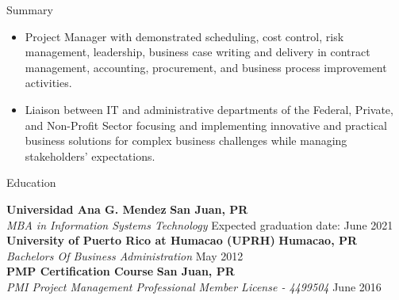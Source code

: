 \documentclass{resume} %
\newcommand{\sectionspace}{\vspace{3mm}}
\begin{document}




\begin{rSection}{Summary}

\begin{itemize}
\item Project Manager with demonstrated scheduling, cost control, risk
  management, leadership, business case writing and delivery in contract
  management, accounting, procurement, and business process improvement
  activities.
\item Liaison between IT and administrative departments of the Federal, Private,
  and Non-Profit Sector focusing and implementing innovative and practical
  business solutions for complex business challenges while managing
  stakeholders’ expectations. \\
\end{itemize}

\end{rSection}




\begin{rSection}{Education}

{\bf Universidad Ana G. Mendez} \hfill {\bf San Juan, PR} \\
\textit{MBA in Information Systems Technology} \hfill Expected graduation date:
June 2021 \\

{\bf University of Puerto Rico at Humacao (UPRH)} \hfill {\bf Humacao, PR} \\
\textit{Bachelors Of Business Administration} \hfill May 2012 \\

{\bf PMP Certification Course} \hfill {\bf San Juan, PR} \\
\textit{PMI Project Management Professional Member License - 4499504} \hfill
June 2016 \\

\end{rSection}
\end{document}
